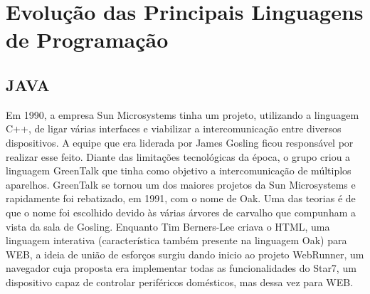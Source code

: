 \documentclass[
    12pt,               %
    openright,          %
    twoside,            %
    a4paper,            %
    brazil              %
    ]{abntex2}
\begin{document}
\frenchspacing 


\imprimircapa

\imprimirfolhaderosto*

\clearpage
{}
\tableofcontents*
\cleardoublepage

\textual

\chapter{Evolução das Principais Linguagens de Programação}

\section{JAVA}

Em 1990, a empresa Sun Microsystems tinha um projeto, utilizando a linguagem
C++, de ligar várias interfaces e viabilizar a intercomunicação entre diversos
dispositivos.  A equipe que era liderada por James Gosling ficou responsável
por realizar esse feito. Diante das limitações tecnológicas da época, o grupo
criou a linguagem GreenTalk que tinha como objetivo a intercomunicação de
múltiplos aparelhos.  GreenTalk se tornou um dos maiores projetos da Sun
Microsystems e rapidamente foi rebatizado, em 1991, com o nome de Oak. Uma das
teorias é de que o nome foi escolhido devido às várias árvores de carvalho que
compunham a vista da sala de Gosling. Enquanto Tim Berners-Lee criava o HTML,
uma linguagem interativa (característica também presente na linguagem Oak) para
WEB, a ideia de união de esforços surgiu dando inicio ao projeto WebRunner, um
navegador cuja proposta era implementar todas as funcionalidades do Star7, um
dispositivo capaz de controlar periféricos domésticos, mas dessa vez para WEB.
\end{document}
